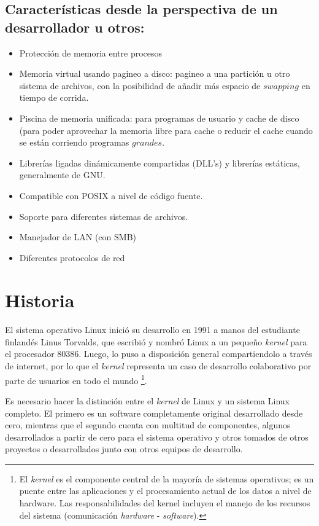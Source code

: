 \documentclass[spanish]{article}
\begin{document}
\subsection{Caracter\'{i}sticas desde la perspectiva de un desarrollador u otros:}
\begin{itemize}
\item Protección de memoria entre procesos
\item Memoria virtual usando pagineo a disco: pagineo a una partición u otro sistema de archivos, con la posibilidad de añadir más espacio de $swapping$ en tiempo de corrida.
\item Piscina de memoria unificada: para programas de usuario y cache de disco (para poder aprovechar la memoria libre para cache o reducir el cache cuando se están corriendo programas $grandes$.
\item Librer\'{i}as ligadas dinámicamente compartidas (DLL's) y librerías estáticas, generalmente de GNU.
\item Compatible con POSIX a nivel de código fuente.
\item Soporte para diferentes sistemas de archivos.
\item Manejador de LAN (con SMB)
\item Diferentes protocolos de red
\end{itemize}

\section{Historia}
\paragraph{} El sistema operativo Linux inició su desarrollo en 1991 a manos del estudiante finlandés Linus Torvalds, que escribió y nombró Linux a un pequeño \textit{kernel} para el procesador 80386. Luego, lo puso a disposición general compartiendolo a través de internet, por lo que el \textit{kernel} representa un caso de desarrollo colaborativo por parte de usuarios en todo el mundo \footnote{El \textit{kernel} es el componente central de la mayoría de sistemas operativos; es un puente entre las aplicaciones y el procesamiento actual de los datos a nivel de hardware. Las responsabilidades del kernel incluyen el manejo de los recursos del sistema (comunicación \textit{hardware} - \textit{software}).}.

Es necesario hacer la distinción entre el \textit{kernel} de Linux y un sistema Linux completo. El primero es un software completamente original desarrollado desde cero, mientras que el segundo cuenta con multitud de componentes, algunos desarrollados a partir de cero para el sistema operativo y otros tomados de otros proyectos o desarrollados junto con otros equipos de desarrollo. 
\end{document}
